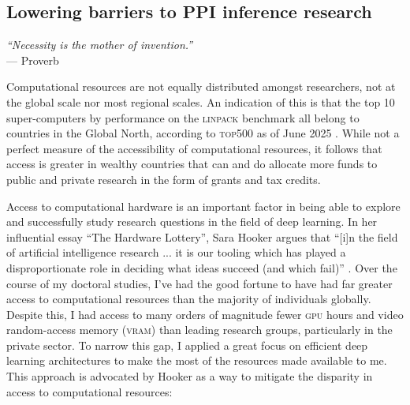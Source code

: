 
\subsection*{Lowering barriers to PPI inference research}

\begin{displayquote}
\begin{singlespace}
\textit{``Necessity is the mother of invention.''}
\\\hspace*{6mm}--- Proverb
\end{singlespace}
\end{displayquote}

Computational resources are not equally distributed amongst researchers, not at the global scale nor most regional scales. An indication of this is that the top 10 super-computers by performance on the \textsc{linpack} benchmark all belong to countries in the Global North, according to \textsc{top500} as of June 2025 \cite{TOP500_2025, linpack}. While not a perfect measure of the accessibility of computational resources, it follows that access is greater in wealthy countries that can and do allocate more funds to public and private research in the form of grants and tax credits.

Access to computational hardware is an important factor in being able to explore and successfully study research questions in the field of deep learning. In her influential essay ``The Hardware Lottery'', Sara Hooker argues that ``[i]n the field of artificial intelligence research ... it is our tooling which has played a disproportionate role in deciding
what ideas succeed (and which fail)'' \cite{hardware_lottery}. Over the course of my doctoral studies, I've had the good fortune to have had far greater access to computational resources than the majority of individuals globally. Despite this, I had access to many orders of magnitude fewer \textsc{gpu} hours and video random-access memory (\textsc{vram}) than leading research groups, particularly in the private sector. To narrow this gap, I applied a great focus on efficient deep learning architectures to make the most of the resources made available to me. This approach is advocated by Hooker as a way to mitigate the disparity in access to computational resources:

